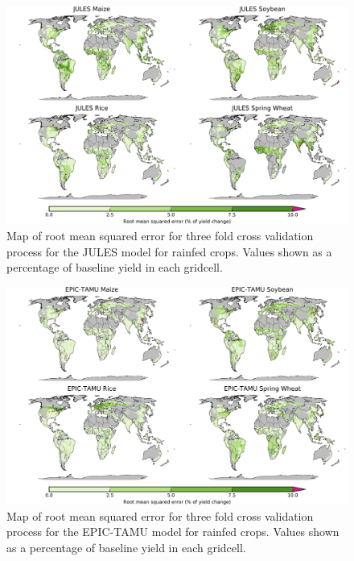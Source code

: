 \documentclass[10pt]{article}
\begin{document}
\begin{figure}[h!]
\centering
\includegraphics[width=15.5cm]{JULES_spatial_MSE_ton_ha.png}
\caption{Map of root mean squared error for three fold cross validation process for the JULES model for rainfed crops. Values shown as a percentage of baseline yield in each gridcell.}
\label{fig:pdssatrmse}
\end{figure}

\begin{figure}[h!]
\centering
\includegraphics[width=15.5cm]{EPIC-TAMU_spatial_MSE_ton_ha.png}
\caption{Map of root mean squared error for three fold cross validation process for the EPIC-TAMU model for rainfed crops. Values shown as a percentage of baseline yield in each gridcell.}
\label{fig:pdssatrmse}
\end{figure}
\end{document}
